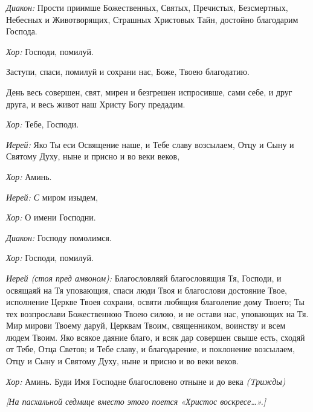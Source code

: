 \begin{mymulticols}
 {\itshape Диакон:} Прости приимше Божественных, Святых, Пречистых, Безсмертных, Небесных и Животворящих, Страшных Христовых Тайн, достойно благодарим Господа. 

{\itshape Хор:} Господи, помилуй. 


  Заступи, спаси, помилуй и сохрани нас, Боже, Твоею благодатию. 


  День весь совершен, свят, мирен и безгрешен испросивше, сами себе, и друг друга, и весь живот наш Христу Богу предадим. 

{\itshape Хор:} Тебе, Господи. 


{\itshape Иерей:} Яко Ты еси Освящение наше, и Тебе славу возсылаем, Отцу и Сыну и Святому Духу, ныне и присно и во веки веков,

{\itshape Хор:} Аминь.

{\itshape Иерей: С} миром изыдем, 

{\itshape Хор:} О имени Господни. 

{\itshape Диакон:} Господу помолимся.

{\itshape Хор:} Господи, помилуй. 




 {\itshape  Иерей (стоя пред амвоном):} Благословляяй благословящия Тя, Господи, и освящаяй на Тя уповающия, спаси люди Твоя и благослови достояние Твое, исполнение Церкве Твоея сохрани, освяти любящия благолепие дому Твоего; Ты тех возпрослави Божественною Твоею силою, и не остави нас, уповающих на Тя. Мир мирови Твоему даруй, Церквам Твоим, священником, воинству и всем людем Твоим. Яко всякое даяние благо, и всяк дар совершен свыше есть, сходяй от Тебе, Отца Светов; и Тебе славу, и благодарение, и поклонение возсылаем, Отцу и Сыну и Святому Духу, ныне и присно и во веки веков. 

{\itshape Хор:} Аминь. Буди Имя Господне благословено отныне и до века {\itshape (Tрижды)}


{\itshape [На пасхальной седмице вместо этого поется «Христос воскресе…».]}




\end{mymulticols}
